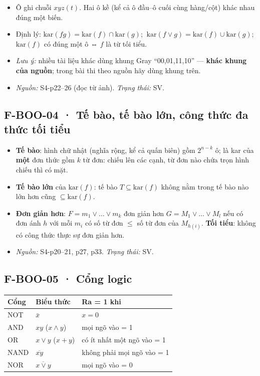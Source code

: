 \documentclass[
  10pt,
  twoside,openany]{book}
\providecommand{\tightlist}{%
  \setlength{\itemsep}{0pt}\setlength{\parskip}{0pt}}
\begin{document}
\begin{itemize}
\tightlist
\item
  Ô ghi chuỗi \(xyz(t)\). Hai ô kề (kể cả ô đầu--ô cuối cùng hàng/cột)
  khác nhau đúng một biến.
\item
  Định lý: \(\mathrm{kar}(fg)=\mathrm{kar}(f)\cap\mathrm{kar}(g)\);
  \(\ \mathrm{kar}(f\vee g)=\mathrm{kar}(f)\cup\mathrm{kar}(g)\);
  \(\mathrm{kar}(f)\) có đúng một ô ⇔ \(f\) là từ tối tiểu.
\item
  \emph{Lưu ý:} nhiều tài liệu khác dùng khung Gray ``00,01,11,10'' ---
  \textbf{khác khung của nguồn}; trong bài thi theo nguồn hãy dùng khung
  trên.
\item
  \emph{Nguồn:} S4-p22--26 (đọc từ ảnh). \emph{Trạng thái:} SV.
\end{itemize}

\hypertarget{F-BOO-04}{%
\subsection{F-BOO-04 · Tế bào, tế bào lớn, công thức đa thức tối
tiểu}\label{F-BOO-04}}

\begin{itemize}
\tightlist
\item
  \textbf{Tế bào}: hình chữ nhật (nghĩa rộng, kể cả quấn biên) gồm
  \(2^{n-k}\) ô; là kar của \textbf{một} đơn thức gồm \(k\) từ đơn:
  chiếu lên các cạnh, từ đơn nào chứa trọn hình chiếu thì có mặt.
\item
  \textbf{Tế bào lớn} của \(\mathrm{kar}(f)\): tế bào
  \(T\subseteq\mathrm{kar}(f)\) không nằm trong tế bào nào lớn hơn cũng
  \(\subseteq\mathrm{kar}(f)\).
\item
  \textbf{Đơn giản hơn}: \(F=m_1\vee\dots\vee m_k\) đơn giản hơn
  \(G=M_1\vee\dots\vee M_l\) nếu có đơn ánh \(h\) với mỗi \(m_i\) có số
  từ đơn \(\le\) số từ đơn của \(M_{h(i)}\). \textbf{Tối tiểu}: không có
  công thức thực sự đơn giản hơn.
\item
  \emph{Nguồn:} S4-p20--21, p27, p33. \emph{Trạng thái:} SV.
\end{itemize}

\hypertarget{F-BOO-05}{%
\subsection{F-BOO-05 · Cổng logic}\label{F-BOO-05}}

\begin{longtable}[]{@{}lll@{}}
\toprule\noalign{}
Cổng & Biểu thức & Ra = 1 khi \\
\midrule\noalign{}
\endhead
\bottomrule\noalign{}
\endlastfoot
NOT & \(\bar x\) & \(x=0\) \\
AND & \(xy\) (\(x\wedge y\)) & mọi ngõ vào = 1 \\
OR & \(x\vee y\) (\(x+y\)) & có ít nhất một ngõ vào = 1 \\
NAND & \(\overline{xy}\) & không phải mọi ngõ vào = 1 \\
NOR & \(\overline{x\vee y}\) & mọi ngõ vào = 0 \\
\end{longtable}
\end{document}
